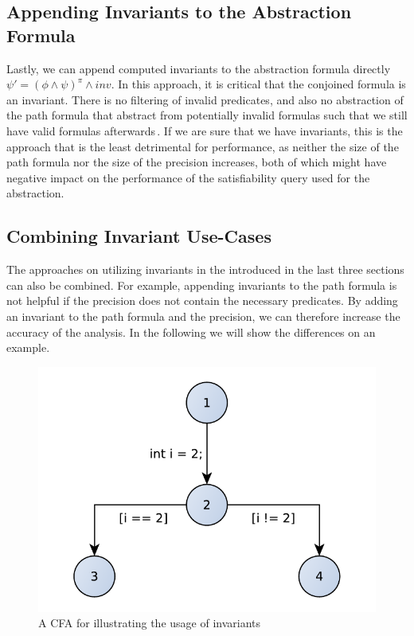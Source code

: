 \subsection{Appending Invariants to the Abstraction Formula}
Lastly, we can append computed invariants to the abstraction formula directly $\psi' = (\phi \land \psi)^\pi \land inv$. In this approach, it is critical that the conjoined formula is an invariant. 
There is no filtering of invalid predicates, and also no abstraction of the path formula that abstract from potentially invalid formulas such that we still have valid formulas afterwards\,. If we 
are sure that we have invariants, this is the approach that is the least detrimental for performance, as neither the size of the path formula nor the size of the precision increases, both of which might 
have negative impact on the performance of the satisfiability query used for the abstraction.

\subsection{Combining Invariant Use-Cases}\label{title:combiningInv}
The approaches on utilizing invariants in the \PredicateCPA{} introduced in the last three sections can also be combined. For example, appending invariants to the path formula is not helpful if
the precision does not contain the necessary predicates. By adding an invariant to the path formula and the precision, we can therefore increase the accuracy of the analysis. In the following we 
will show the differences on an example.

\begin{figure}
 \centering
 \includegraphics[width=.5\textwidth]{../graphics/inv_usage_example}
 \caption{A \acs{CFA} for illustrating the usage of invariants}
 \label{fig:inv_usage_example}
\end{figure}

